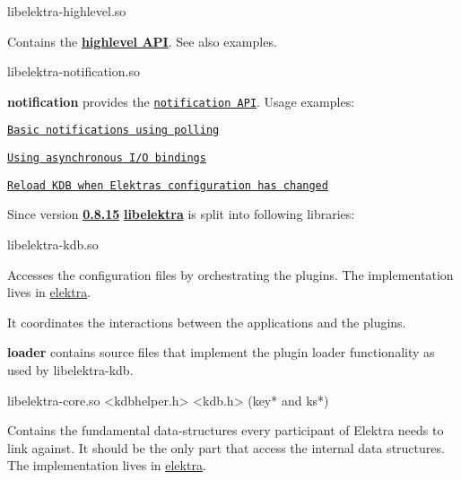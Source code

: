 
\begin{DoxyCode}
libelektra-highlevel.so
\end{DoxyCode}


Contains the {\bfseries \hyperlink{src_libs_highlevel_README_md}{highlevel A\+PI}}. See also examples.


\begin{DoxyCode}
libelektra-notification.so
\end{DoxyCode}


{\bfseries notification} provides the \href{https://doc.libelektra.org/api/current/html/group__kdbnotification.html}{\tt notification A\+PI}. Usage examples\+:


\begin{DoxyItemize}
\item \href{https://www.libelektra.org/examples/notificationpolling}{\tt Basic notifications using polling}
\item \href{https://www.libelektra.org/examples/notificationasync}{\tt Using asynchronous I/O bindings}
\item \href{https://www.libelektra.org/examples/notificationreload}{\tt Reload K\+DB when Elektra\textquotesingle{}s configuration has changed}
\end{DoxyItemize}

Since version {\bfseries \hyperlink{doc_decisions_library_split_md}{0.8.15}} {\bfseries \hyperlink{md_src_libs_elektra_README_src_libs_elektra_README_md}{libelektra}} is split into following libraries\+:

 


\begin{DoxyCode}
libelektra-kdb.so
\end{DoxyCode}


Accesses the configuration files by orchestrating the plugins. The implementation lives in \hyperlink{md_src_libs_elektra_README_src_libs_elektra_README_md}{elektra}.

It coordinates the interactions between the applications and the plugins.

{\bfseries loader} contains source files that implement the plugin loader functionality as used by {\ttfamily libelektra-\/kdb}.


\begin{DoxyCode}
libelektra-core.so
<kdbhelper.h>
<kdb.h> (key* and ks*)
\end{DoxyCode}


Contains the fundamental data-\/structures every participant of Elektra needs to link against. It should be the only part that access the internal data structures. The implementation lives in \hyperlink{md_src_libs_elektra_README_src_libs_elektra_README_md}{elektra}.


